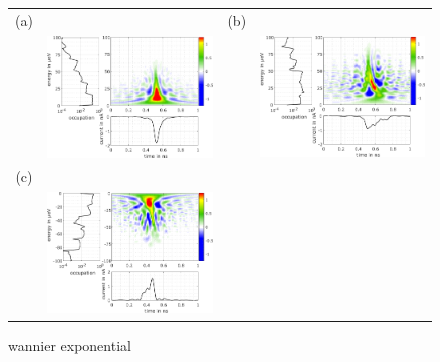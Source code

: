 \begin{figure}[hptb]
	\begin{center}
		\begin{tabular}{c c c c}
			(a) & & (b) & \\ 
			& \includegraphics[width = 6.5 cm]{./appC/wannierwigData_exponential_50ps_1e_JMAP_f_vf-el-0} & & \includegraphics[width = 6.5 cm]{./appC/wannierwigData_exponential_50ps_1e_JMAP_f_vf-el-1} \\
			(c) & & & \\
			& \includegraphics[width = 6.5 cm]{./appC/wannierwigData_exponential_50ps_1e_JMAP_f_vf-ho-0} & &
		\end{tabular}
	\end{center}
	
	\caption{wannier exponential}
	\label{fig: wannier exponential}
\end{figure}

